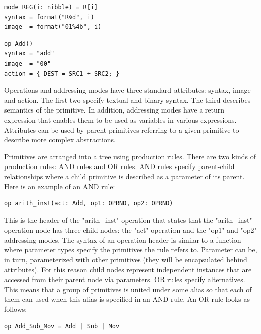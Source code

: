 \documentclass[oneside,final,14pt]{extreport}
\begin{document}
\begin{lstlisting}
mode REG(i: nibble) = R[i]
syntax = format("R%d", i)
image  = format("01%4b", i)
\end{lstlisting}

\begin{lstlisting}
op Add()
syntax = "add" 
image  = "00" 
action = { DEST = SRC1 + SRC2; }
\end{lstlisting}

Operations and addressing modes have three standard attributes: syntax, image
and action. The first two specify textual and binary syntax. The third
describes semantics of the primitive. In addition, addressing modes have
a return expression that enables them to be used as variables in various
expressions. Attributes can be used by parent primitives referring to a given
primitive to describe more complex abstractions.

Primitives are arranged into a tree using production rules. There are two kinds
of production rules: AND rules and OR rules. AND rules specify parent-child
relationships where a child primitive is described as a parameter of its
parent. Here is an example of an AND rule:

\begin{lstlisting}
op arith_inst(act: Add, op1: OPRND, op2: OPRND)
\end{lstlisting}

This is the header of the "arith{\_}inst" operation that states that the
"arith{\_}inst" operation node has three child nodes: the "act" operation and the
"op1" and "op2" addressing modes. The syntax of an operation header is similar
to a function where parameter types specify the primitives the rule refers to.
Parameter can be, in turn, parameterized with other primitives (they will be
encapsulated behind attributes). For this reason child nodes represent
independent instances that are accessed from their parent node via parameters.
OR rules specify alternatives. This means that a group of primitives is united
under some alias so that each of them can used when this alias is specified in
an AND rule. An OR rule looks as follows:

\begin{lstlisting}
op Add_Sub_Mov = Add | Sub | Mov
\end{lstlisting}
\end{document}

